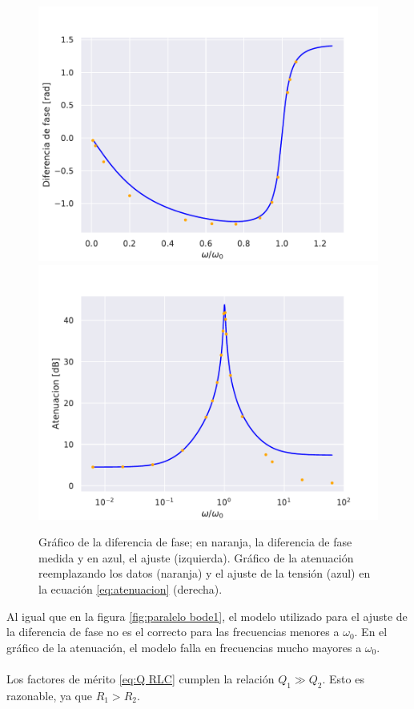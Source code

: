 \begin{figure} [H]
    \centering
    \includegraphics[scale=0.5]{figuras/RLC-PARALELO-2/fase.pdf}
    \includegraphics[scale=0.5]{figuras/RLC-PARALELO-2/atenuacion.pdf}
    \caption{Gráfico de la diferencia de fase; en naranja, la diferencia de fase medida y en azul, el ajuste (izquierda). Gráfico de la atenuación reemplazando los datos (naranja) y el ajuste de la tensión (azul) en la ecuación \eqref{eq:atenuacion} (derecha).}
    \label{fig:paralelo bode2}
\end{figure}
Al igual que en la figura \ref{fig:paralelo bode1}, el modelo utilizado para el ajuste de la diferencia de fase no es el correcto para las frecuencias menores a $\omega_0$. En el gráfico de la atenuación, el modelo falla en frecuencias mucho mayores a $\omega_0$.
\paragraph{}
Los factores de mérito \eqref{eq:Q RLC} cumplen la relación $Q_1\gg Q_2$. Esto es razonable, ya que $R_1 > R_2$.